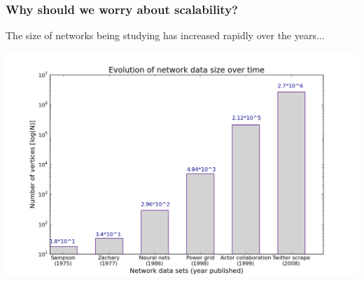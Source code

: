 \documentclass[xcolor=dvipsnames, 9pt]{beamer}
\begin{document}
\begin{frame}[fragile]
    \frametitle{Why should we worry about scalability?}
    The size of networks being studying has increased rapidly over the years...
    \begin{center}
        \includegraphics[scale=.37]{../images/figures/net_size_evo.png}
    \end{center}
\end{frame}
\end{document}
